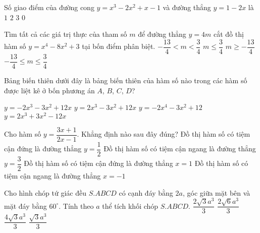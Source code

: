 \begin{ex}%
Số giao điểm của đường cong $y=x^3-2x^2+x-1$ và đường thẳng $y=1-2x$ là
\choice
{\True $1$}
{$2$}
{$3$}
{$0$}
\end{ex}

\begin{ex}%
Tìm tất cả các giá trị thực của tham số $m$ để đường thẳng $y=4m$ cắt đồ thị hàm số $y=x^4-8x^2+3$ tại bốn điểm phân biệt.
\choice
{\True $-\dfrac{13}{4}<m<\dfrac{3}{4}$}
{$m\leq\dfrac{3}{4}$}
{$m\geq-\dfrac{13}{4}$}
{$-\dfrac{13}{4}\leq m\leq\dfrac{3}{4}$}
\end{ex}

\begin{ex}%
Bảng biến thiên dưới đây là bảng biến thiên của hàm số nào trong các hàm số được liệt kê ở bốn phương án $A$, $B$, $C$, $D$?
\vspace*{-10pt}
\begin{center}
\immini{}
{
}
\end{center}
\choice
{$y=-2x^3-3x^2+12x$}
{$y=2x^3-3x^2+12x$}
{$y=-2x^4-3x^2+12$}
{\True $y=2x^3+3x^2-12x$}
\end{ex}

\begin{ex}%
Cho hàm số $y=\dfrac{3x+1}{2x-1}$. Khẳng định nào sau đây đúng?
\choice
{Đồ thị hàm số có tiệm cận đứng là đường thẳng $y=\dfrac{1}{2}$}
{\True Đồ thị hàm số có tiệm cận ngang là đường thẳng $y=\dfrac{3}{2}$}
{Đồ thị hàm số có tiệm cận đứng là đường thẳng $x=1$}
{Đồ thị hàm số có tiệm cận ngang là đường thẳng $x=-1$}
\end{ex}

\begin{ex}%
Cho hình chóp tứ giác đều $S.ABCD$ có cạnh đáy bằng $2a$, góc giữa mặt bên và mặt đáy bằng $60^\circ$. Tính theo $a$ thể tích khối chóp $S.ABCD$.
\choice
{$\dfrac{2\sqrt{3}a^3}{3}$}
{$\dfrac{2\sqrt{6}a^3}{3}$}
{\True $\dfrac{4\sqrt{3}a^3}{3}$}
{$\dfrac{\sqrt{3}a^3}{3}$}
\end{ex}

